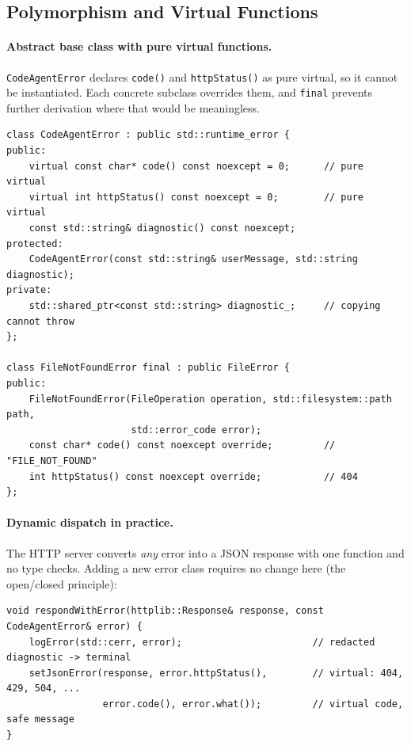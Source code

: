 \documentclass[12pt,a4paper,oneside]{book}
\begin{document}
\subsection{Polymorphism and Virtual Functions}

\paragraph{Abstract base class with pure virtual functions.}
\texttt{CodeAgentError} declares \texttt{code()} and \texttt{httpStatus()} as
pure virtual, so it cannot be instantiated. Each concrete subclass overrides
them, and \texttt{final} prevents further derivation where that would be
meaningless.

\begin{lstlisting}[style=codeagentcpp,caption={Abstract base class and an overriding subclass},label={lst:ca-virtual}]
class CodeAgentError : public std::runtime_error {
public:
    virtual const char* code() const noexcept = 0;      // pure virtual
    virtual int httpStatus() const noexcept = 0;        // pure virtual
    const std::string& diagnostic() const noexcept;
protected:
    CodeAgentError(const std::string& userMessage, std::string diagnostic);
private:
    std::shared_ptr<const std::string> diagnostic_;     // copying cannot throw
};

class FileNotFoundError final : public FileError {
public:
    FileNotFoundError(FileOperation operation, std::filesystem::path path,
                      std::error_code error);
    const char* code() const noexcept override;         // "FILE_NOT_FOUND"
    int httpStatus() const noexcept override;           // 404
};
\end{lstlisting}

\paragraph{Dynamic dispatch in practice.}
The HTTP server converts \emph{any} error into a JSON response with one
function and no type checks. Adding a new error class requires no change here
(the open/closed principle):

\begin{lstlisting}[style=codeagentcpp,caption={One handler for every error type through virtual calls},label={lst:ca-dispatch}]
void respondWithError(httplib::Response& response, const CodeAgentError& error) {
    logError(std::cerr, error);                       // redacted diagnostic -> terminal
    setJsonError(response, error.httpStatus(),        // virtual: 404, 429, 504, ...
                 error.code(), error.what());         // virtual code, safe message
}
\end{lstlisting}
\end{document}
